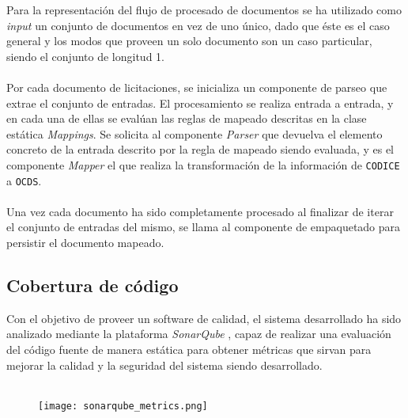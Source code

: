         \noindent Para la representación del flujo de procesado de documentos se ha utilizado como \textit{input} un conjunto de documentos en vez de uno único, dado que éste es el caso general y los modos que proveen un solo documento son un caso particular, siendo el conjunto de longitud 1.
        \\ \\
        Por cada documento de licitaciones, se inicializa un componente de parseo que extrae el conjunto de entradas. El procesamiento se realiza entrada a entrada, y en cada una de ellas se evalúan las reglas de mapeado descritas en la clase estática \textit{Mappings}. Se solicita al componente \textit{Parser} que devuelva el elemento concreto de la entrada descrito por la regla de mapeado siendo evaluada, y es el componente \textit{Mapper} el que realiza la transformación de la información de \texttt{CODICE} a \texttt{OCDS}.
        \\ \\
        Una vez cada documento ha sido completamente procesado al finalizar de iterar el conjunto de entradas del mismo, se llama al componente de empaquetado para persistir el documento mapeado.
        
\newpage
    \subsection{Cobertura de código}
        Con el objetivo de proveer un software de calidad, el sistema desarrollado ha sido analizado mediante la plataforma \textit{SonarQube} \cite{SONARQUBE}, capaz de realizar una evaluación del código fuente de manera estática para obtener métricas que sirvan para mejorar la calidad y la seguridad del sistema siendo desarrollado.
        \\ \\
        
        \begin{figure}[h]
            \centering
            \texttt{[image: sonarqube\_metrics.png]}
            \label{fig:sonarmetrics}
        \end{figure}
        
